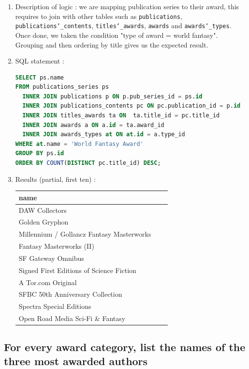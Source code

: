 \documentclass[doubleside, titlepage]{article}
\begin{document}
	\begin{enumerate}
	\item Description of logic : we are mapping publication series to their award, this requires to join with other tables such as \texttt{publications}, \texttt{publications\char`_contents}, \texttt{titles\char`_awards}, \texttt{awards} and \texttt{awards\char`_types}. Once done, we taken the condition "type of award = world fantasy". Grouping and then ordering by title gives us the expected result.
	\item SQL statement :
		\begin{lstlisting}[language=SQL,showspaces=false,basicstyle=\ttfamily,numberstyle=\tiny,commentstyle=\color{gray}]
SELECT ps.name
FROM publications_series ps
  INNER JOIN publications p ON p.pub_series_id = ps.id
  INNER JOIN publications_contents pc ON pc.publication_id = p.id
  INNER JOIN titles_awards ta ON  ta.title_id = pc.title_id
  INNER JOIN awards a ON a.id = ta.award_id
  INNER JOIN awards_types at ON at.id = a.type_id
WHERE at.name = 'World Fantasy Award'
GROUP BY ps.id
ORDER BY COUNT(DISTINCT pc.title_id) DESC;
		\end{lstlisting}

	\item Results (partial, first ten) :\\

	\begin{tabular}{|l|c|r|}
	  \hline
		name \\
	  \hline
		DAW Collectors\\
		Golden Gryphon\\
		Millennium / Gollancz Fantasy Masterworks\\
		Fantasy Masterworks (II)\\
		SF Gateway Omnibus\\
		Signed First Editions of Science Fiction\\
		A Tor.com Original\\
		SFBC 50th Anniversary Collection\\
		Spectra Special Editions\\
		Open Road Media Sci-Fi \& Fantasy\\
	  \hline
	\end{tabular}
\end{enumerate}

\newpage

\subsection{For every award category, list the names of the three most awarded authors}
\end{document}

